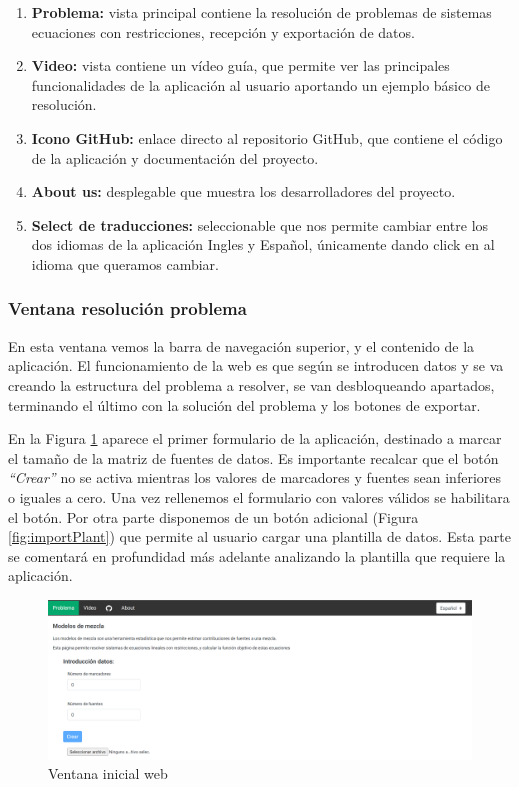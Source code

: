 \begin{enumerate}
    \item \textbf{Problema:} vista principal contiene la resolución de problemas de sistemas ecuaciones con restricciones, recepción y exportación de datos. 
    \item \textbf{Video:} vista contiene un vídeo guía, que permite ver las principales funcionalidades de la aplicación al usuario aportando un ejemplo básico de resolución.
    \item \textbf{Icono GitHub:} enlace directo al repositorio GitHub, que contiene el código de la aplicación y documentación del proyecto.
    \item \textbf{About us:} desplegable que muestra los desarrolladores del proyecto.
    \item \textbf{Select de traducciones:} seleccionable que nos permite cambiar entre los dos idiomas de la aplicación Ingles y Español, únicamente dando click en al idioma que queramos cambiar.
\end{enumerate}

\subsubsection{Ventana resolución problema}

En esta ventana vemos la barra de navegación superior, y el contenido de la aplicación. El funcionamiento de la web es que según se introducen datos y se va creando la estructura del problema a resolver, se van desbloqueando apartados, terminando el último con la solución del problema y los botones de exportar.

En la Figura \ref{fig:ventana_inicial} aparece el primer formulario de la aplicación, destinado a marcar el tamaño de la matriz de fuentes de datos. Es importante recalcar que el botón \textit{``Crear''} no se activa mientras los valores de marcadores y fuentes sean inferiores o iguales a cero. Una vez rellenemos el formulario con valores válidos se habilitara el botón. Por otra parte disponemos de un botón adicional (Figura \ref{fig:importPlant}) que permite al usuario cargar una plantilla de datos. Esta parte se comentará en profundidad más adelante analizando la plantilla que requiere la aplicación.


\begin{figure}[h!] 
\centering
    \includegraphics[width=1\textwidth]{img/ventana_inicial.PNG}
\caption{Ventana inicial web}
\label{fig:ventana_inicial}
\end{figure}


